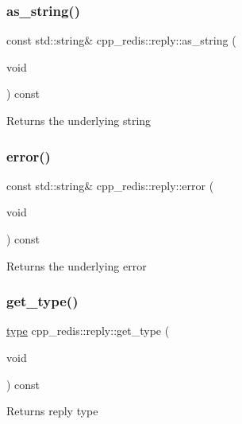 \subsubsection{\texorpdfstring{as\+\_\+string()}{as\_string()}}
{\footnotesize\ttfamily const std\+::string\& cpp\+\_\+redis\+::reply\+::as\+\_\+string (\begin{DoxyParamCaption}\item[{void}]{ }\end{DoxyParamCaption}) const}

\begin{DoxyReturn}{Returns}
the underlying string 
\end{DoxyReturn}
\mbox{\label{classcpp__redis_1_1reply_a8e4d3fe1636627fdee6361705a2b1c1e}} 
\subsubsection{\texorpdfstring{error()}{error()}}
{\footnotesize\ttfamily const std\+::string\& cpp\+\_\+redis\+::reply\+::error (\begin{DoxyParamCaption}\item[{void}]{ }\end{DoxyParamCaption}) const}

\begin{DoxyReturn}{Returns}
the underlying error 
\end{DoxyReturn}
\mbox{\label{classcpp__redis_1_1reply_ab196726881aea799186228d49a2283ba}} 
\subsubsection{\texorpdfstring{get\+\_\+type()}{get\_type()}}
{\footnotesize\ttfamily \hyperlink{classcpp__redis_1_1reply_acc272b2a52164cac1d110c619a0b25bd}{type} cpp\+\_\+redis\+::reply\+::get\+\_\+type (\begin{DoxyParamCaption}\item[{void}]{ }\end{DoxyParamCaption}) const}

\begin{DoxyReturn}{Returns}
reply type 
\end{DoxyReturn}
\mbox{\label{classcpp__redis_1_1reply_a3a94881a46125d281cb36191c4b7d19a}} 
